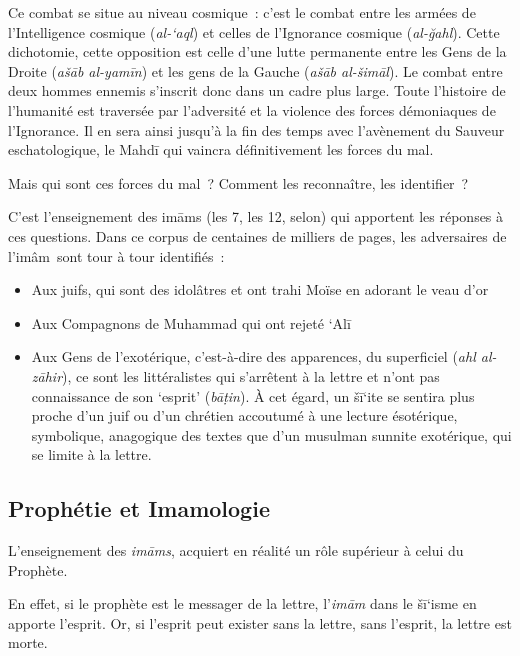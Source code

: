 Ce combat se situe au niveau cosmique~: c'est le combat entre les armées
de l'Intelligence cosmique (\emph{al-`aql}) et celles de l'Ignorance
cosmique (\emph{al-ğahl}). Cette dichotomie, cette opposition est celle
d'une lutte permanente entre les Gens de la Droite (\emph{ašāb
al-yamīn}) et les gens de la Gauche (\emph{ašāb al-šimāl}). Le combat
entre deux hommes ennemis s'inscrit donc dans un cadre plus large. Toute
l'histoire de l'humanité est traversée par l'adversité et la violence
des forces démoniaques de l'Ignorance. Il en sera ainsi jusqu'à la fin
des temps avec l'avènement du Sauveur eschatologique, le Mahdī qui
vaincra définitivement les forces du mal.

Mais qui sont ces forces du mal~? Comment les reconnaître, les
identifier~?

C'est l'enseignement des imāms (les 7, les 12, selon) qui apportent les
réponses à ces questions. Dans ce corpus de centaines de milliers de
pages, les adversaires de l'imâm~sont tour à tour identifiés~:

\begin{itemize}
\item
  Aux juifs, qui sont des idolâtres et ont trahi Moïse en adorant le
  veau d'or
\item
  Aux Compagnons de Muhammad qui ont rejeté `Alī
\item
  Aux Gens de l'exotérique, c'est-à-dire des apparences, du superficiel
  (\emph{ahl al-zāhir}), ce sont les littéralistes qui s'arrêtent à la
  lettre et n'ont pas connaissance de son `esprit' (\emph{bāṭin}). À cet
  égard, un šī`ite se sentira plus proche d'un juif ou d'un chrétien
  accoutumé à une lecture ésotérique, symbolique, anagogique des textes
  que d'un musulman sunnite exotérique, qui se limite à la lettre.
\end{itemize}

 
\subsection{Prophétie et
Imamologie}\label{prophuxe9tie-et-imamologie}

L'enseignement des \emph{imāms}, acquiert en réalité un rôle supérieur à
celui du Prophète.

En effet, si le prophète est le messager de la lettre, l'\emph{imām}
dans le šī`isme en apporte l'esprit. Or, si l'esprit peut exister sans
la lettre, sans l'esprit, la lettre est morte.


